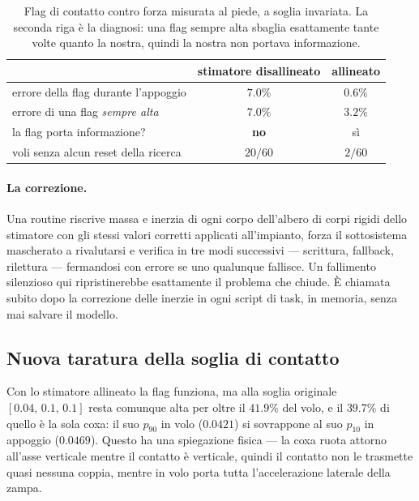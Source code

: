 \documentclass[11pt,a4paper]{article}
\begin{document}
\begin{table}[htbp]
\centering
\caption{Flag di contatto contro forza misurata al piede, a soglia invariata.
La seconda riga \`e la diagnosi: una flag sempre alta sbaglia esattamente tante
volte quanto la nostra, quindi la nostra non portava informazione.}
\label{tab:estimator}
\small
\begin{tabular}{@{}lcc@{}}
\toprule
 & \textbf{stimatore disallineato} & \textbf{allineato} \\
\midrule
errore della flag durante l'appoggio      & $7.0\%$ & $\mathbf{0.6\%}$ \\
errore di una flag \emph{sempre alta}     & $7.0\%$ & $3.2\%$ \\
la flag porta informazione?               & \textbf{no} & s\`i \\
voli senza alcun reset della ricerca      & $20/60$ & $2/60$ \\
\bottomrule
\end{tabular}
\end{table}

\paragraph{La correzione.} Una routine riscrive massa e inerzia di ogni corpo
dell'albero di corpi rigidi dello stimatore con gli stessi valori corretti
applicati all'impianto, forza il sottosistema mascherato a rivalutarsi e
verifica in tre modi successivi --- scrittura, fallback, rilettura --- fermandosi
con errore se uno qualunque fallisce. Un fallimento silenzioso qui
ripristinerebbe esattamente il problema che chiude. \`E chiamata subito dopo la
correzione delle inerzie in ogni script di task, in memoria, senza mai salvare
il modello.

\subsection{Nuova taratura della soglia di contatto}
\label{sec:threshold}

Con lo stimatore allineato la flag funziona, ma alla soglia originale
$[0.04,\,0.1,\,0.1]$ resta comunque alta per oltre il $41.9\%$ del volo, e il
$39.7\%$ di quello \`e la sola coxa: il suo $p_{90}$ in volo ($0.0421$) si
sovrappone al suo $p_{10}$ in appoggio ($0.0469$). Questo ha una spiegazione
fisica --- la coxa ruota attorno all'asse verticale mentre il contatto \`e
verticale, quindi il contatto non le trasmette quasi nessuna coppia, mentre in
volo porta tutta l'accelerazione laterale della zampa.
\end{document}
